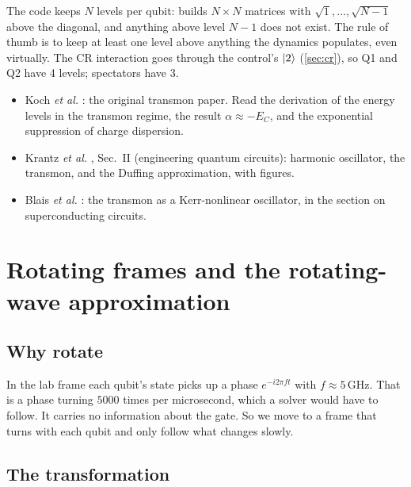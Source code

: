 \documentclass[11pt,a4paper]{article}
\DeclareRobustCommand{\code}[1]{\texttt{\detokenize{#1}}}
\newcommand{\GHz}{\,\mathrm{GHz}}
\begin{document}
The code keeps \(N\) levels per qubit: \code{dq.destroy} builds \(N\times N\) matrices with
\(\sqrt{1},\dots,\sqrt{N-1}\) above the diagonal, and anything above level \(N-1\) does not exist. The rule of thumb is to
keep at least one level above anything the dynamics populates, even virtually. The CR interaction goes through the
control's \(\ket{2}\) (\cref{sec:cr}), so Q1 and Q2 have 4 levels; spectators have 3.

\begin{readbox}
\begin{itemize}
\item Koch \emph{et al.} \cite{koch2007}: the original transmon paper. Read the derivation of the energy levels in the
  transmon regime, the result \(\alpha\approx-E_C\), and the exponential suppression of charge dispersion.
\item Krantz \emph{et al.} \cite{krantz2019}, Sec.~II (engineering quantum circuits): harmonic oscillator, the
  transmon, and the Duffing approximation, with figures.
\item Blais \emph{et al.} \cite{blais2021}: the transmon as a Kerr-nonlinear oscillator, in the section on
  superconducting circuits.
\end{itemize}
\end{readbox}

\section{Rotating frames and the rotating-wave approximation}\label{sec:frames}

\subsection{Why rotate}

In the lab frame each qubit's state picks up a phase \(e^{-i2\pi f t}\) with \(f\approx 5\GHz\). That is a phase
turning \(5000\) times per microsecond, which a solver would have to follow. It carries no information about the
gate. So we move to a frame that turns with each qubit and only follow what changes slowly.

\subsection{The transformation}
\end{document}

